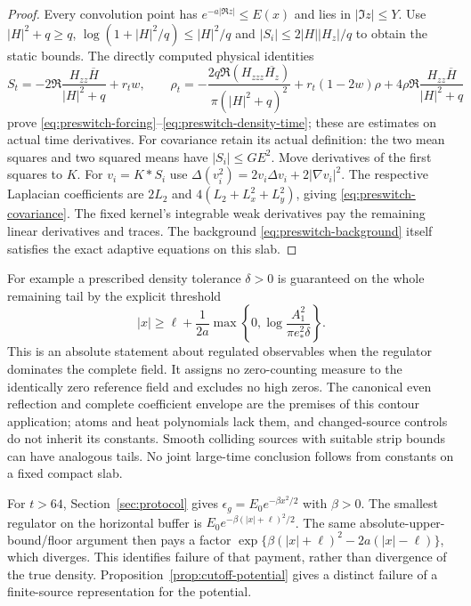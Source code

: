 \begin{proof}
Every convolution point has
$e^{-a|\Re z|}\le E(x)$ and lies in $|\Im z|\le Y$.
Use $|H|^2+q\ge q$, $\log(1+|H|^2/q)\le|H|^2/q$ and
$|S_i|\le2|H||H_z|/q$ to obtain the static bounds.
The directly computed physical identities
\[
 S_t=-2\Re\frac{H_{zz}\overline H}{|H|^2+q}+r_tw,
 \qquad
 \rho_t=-\frac{2q\Re(H_{zzz}\overline{H_z})}{\pi(|H|^2+q)^2}
  +r_t(1-2w)\rho+4\rho\Re\frac{H_{zz}\overline H}{|H|^2+q}
\]
prove \eqref{eq:preswitch-forcing}--\eqref{eq:preswitch-density-time};
these are estimates on actual time derivatives.
For covariance retain its actual definition: the two mean squares and
two squared means have $|S_i|\le GE^2$.
Move derivatives of the first squares to $K$. For $v_i=K*S_i$ use
$\Delta(v_i^2)=2v_i\Delta v_i+2|\nabla v_i|^2$.
The respective Laplacian coefficients are $2L_2$ and
$4(L_2+L_x^2+L_y^2)$, giving
\eqref{eq:preswitch-covariance}. The fixed kernel's integrable weak
derivatives pay the remaining linear derivatives and traces. The
background \eqref{eq:preswitch-background} itself satisfies the exact
adaptive equations on this slab.
\end{proof}

For example a prescribed density tolerance $\delta>0$ is guaranteed on
the whole remaining tail by the explicit threshold
\begin{equation}
 |x|\ge\ell+\frac1{2a}\max\left\{0,
              \log\frac{A_1^2}{\pi e_*^2\delta}\right\}.
 \label{eq:preswitch-tail-threshold}
\end{equation}
This is an absolute statement about regulated observables when the
regulator dominates the complete field. It assigns no zero-counting
measure to the identically zero reference field and excludes no high
zeros. The canonical even reflection and complete coefficient envelope
are the premises of this contour application; atoms and heat polynomials
lack them, and changed-source controls do not inherit its constants.
Smooth colliding sources with suitable strip bounds can have analogous
tails. No joint large-time conclusion follows from constants on a fixed
compact slab.

For $t>64$, Section~\ref{sec:protocol} gives
$\epsilon_g=E_0e^{-\beta x^2/2}$ with $\beta>0$.
The smallest regulator on the horizontal buffer is
$E_0e^{-\beta(|x|+\ell)^2/2}$. The same absolute-upper-bound/floor
argument then pays a factor
$\exp\{\beta(|x|+\ell)^2-2a(|x|-\ell)\}$, which diverges.
This identifies failure of that payment, rather than divergence of the
true density. Proposition~\ref{prop:cutoff-potential} gives a distinct
failure of a finite-source representation for the potential.

